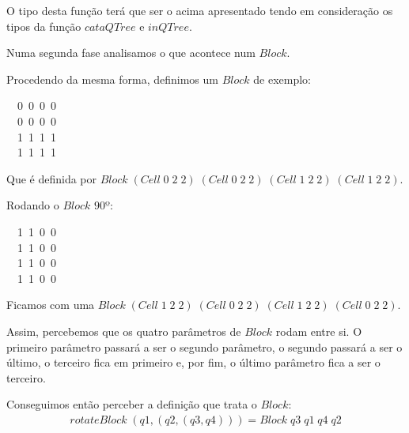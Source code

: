 \documentclass[a4paper]{article}
\newcommand{\Conid}[1]{\mathit{#1}}
\newcommand{\Varid}[1]{\mathit{#1}}
\begin{document}
\begin{enumerate}
O tipo desta função terá que ser o acima apresentado tendo em consideração
os tipos da função \ensuremath{\Varid{cataQTree}} e \ensuremath{\Varid{inQTree}}.

\vspace{0.5cm}

Numa segunda fase analisamos o que acontece num \ensuremath{\Conid{Block}}.

Procedendo da mesma forma, definimos um \ensuremath{\Conid{Block}} de exemplo:
\begin{tabbing}\ttfamily
~~0~0~0~0~\\
\ttfamily ~~0~0~0~0~\\
\ttfamily ~~1~1~1~1~\\
\ttfamily ~~1~1~1~1~
\end{tabbing}

Que é definida por \ensuremath{\Conid{Block}\;(\Conid{Cell}\;\mathrm{0}\;\mathrm{2}\;\mathrm{2})\;(\Conid{Cell}\;\mathrm{0}\;\mathrm{2}\;\mathrm{2})\;(\Conid{Cell}\;\mathrm{1}\;\mathrm{2}\;\mathrm{2})\;(\Conid{Cell}\;\mathrm{1}\;\mathrm{2}\;\mathrm{2})}.

Rodando o \ensuremath{\Conid{Block}} $90º$:
\begin{tabbing}\ttfamily
~~1~1~0~0~\\
\ttfamily ~~1~1~0~0~\\
\ttfamily ~~1~1~0~0~\\
\ttfamily ~~1~1~0~0~
\end{tabbing}

Ficamos com uma \ensuremath{\Conid{Block}\;(\Conid{Cell}\;\mathrm{1}\;\mathrm{2}\;\mathrm{2})\;(\Conid{Cell}\;\mathrm{0}\;\mathrm{2}\;\mathrm{2})\;(\Conid{Cell}\;\mathrm{1}\;\mathrm{2}\;\mathrm{2})\;(\Conid{Cell}\;\mathrm{0}\;\mathrm{2}\;\mathrm{2})}.

Assim, percebemos que os quatro parâmetros de \ensuremath{\Conid{Block}} rodam entre si.
O primeiro parâmetro passará a ser o segundo parâmetro, o segundo passará
a ser o último, o terceiro fica em primeiro e, por fim, o último parâmetro
fica a ser o terceiro.

Conseguimos então perceber a definição que trata o \ensuremath{\Conid{Block}}:
\begin{eqnarray*}
\ensuremath{\Varid{rotateBlock}\;(\Varid{q1},(\Varid{q2},(\Varid{q3},\Varid{q4})))\mathrel{=}\Conid{Block}\;\Varid{q3}\;\Varid{q1}\;\Varid{q4}\;\Varid{q2}}
\end{eqnarray*}


\end{enumerate}
\end{document}
